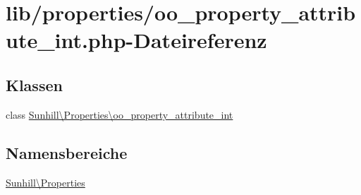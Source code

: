 \hypertarget{oo__property__attribute__int_8php}{}\section{lib/properties/oo\+\_\+property\+\_\+attribute\+\_\+int.php-\/\+Dateireferenz}
\label{oo__property__attribute__int_8php}
\subsection*{Klassen}
\begin{DoxyCompactItemize}
\item 
class \hyperlink{classSunhill_1_1Properties_1_1oo__property__attribute__int}{Sunhill\textbackslash{}\+Properties\textbackslash{}oo\+\_\+property\+\_\+attribute\+\_\+int}
\end{DoxyCompactItemize}
\subsection*{Namensbereiche}
\begin{DoxyCompactItemize}
\item 
 \hyperlink{namespaceSunhill_1_1Properties}{Sunhill\textbackslash{}\+Properties}
\end{DoxyCompactItemize}
